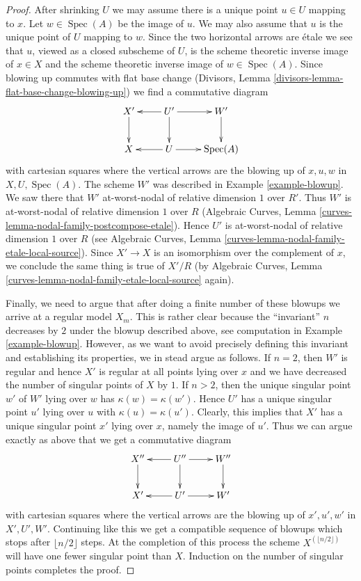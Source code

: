\documentclass[10pt,a4paper]{amsart}
\theoremstyle{plain}
\theoremstyle{definition}
\theoremstyle{remark}
\numberwithin{equation}{subsection}
\def\Spec{\mathop{\mathrm{Spec}}}
\begin{document}
\begin{proof}
\medskip\noindent
After shrinking $U$ we may assume there is
a unique point $u \in U$ mapping to $x$.
Let $w \in \Spec(A)$ be the image of $u$.
We may also assume that $u$ is the unique point of $U$
mapping to $w$.
Since the two horizontal arrows are \'etale
we see that $u$, viewed as a closed subscheme of $U$,
is the scheme theoretic inverse image of $x \in X$ and the
scheme theoretic inverse image of $w \in \Spec(A)$.
Since blowing up commutes with flat base change
(Divisors, Lemma \ref{divisors-lemma-flat-base-change-blowing-up})
we find a commutative diagram
$$
\xymatrix{
X' \ar[d] &
U' \ar[l] \ar[d] \ar[r] &
W' \ar[d] \\
X & U \ar[l] \ar[r] & \Spec(A)
}
$$
with cartesian squares where the vertical arrows are the blowing
up of $x, u, w$ in $X, U, \Spec(A)$. The scheme $W'$ was described
in Example \ref{example-blowup}. We saw there that $W'$
at-worst-nodal of relative dimension $1$ over $R'$. Thus
$W'$ is at-worst-nodal of relative dimension $1$ over $R$
(Algebraic Curves, Lemma \ref{curves-lemma-nodal-family-postcompose-etale}).
Hence $U'$ is at-worst-nodal of relative dimension $1$ over $R$ (see
Algebraic Curves, Lemma \ref{curves-lemma-nodal-family-etale-local-source}).
Since $X' \to X$ is an isomorphism over the complement of $x$,
we conclude the same thing is true of $X'/R$ (by
Algebraic Curves, Lemma \ref{curves-lemma-nodal-family-etale-local-source}
again).

\medskip\noindent
Finally, we need to argue that after doing a finite number
of these blowups we arrive at a regular model $X_m$.
This is rather clear because the ``invariant'' $n$ decreases by $2$
under the blowup described above, see computation in
Example \ref{example-blowup}.
However, as we want to avoid precisely defining this invariant
and establishing its properties, we in stead argue as follows.
If $n = 2$, then $W'$ is regular and hence $X'$
is regular at all points lying over $x$ and we have
decreased the number of singular points of $X$ by $1$.
If $n > 2$, then the unique singular point $w'$ of $W'$ lying over $w$
has $\kappa(w) = \kappa(w')$. Hence $U'$ has a unique
singular point $u'$ lying over $u$ with $\kappa(u) = \kappa(u')$.
Clearly, this implies that $X'$ has a unique singular point $x'$
lying over $x$, namely the image of $u'$. Thus we can
argue exactly as above that we get a commutative diagram
$$
\xymatrix{
X'' \ar[d] &
U'' \ar[l] \ar[d] \ar[r] &
W'' \ar[d] \\
X' & U' \ar[l] \ar[r] & W'
}
$$
with cartesian squares where the vertical arrows are the blowing
up of $x', u', w'$ in $X', U', W'$. Continuing like this we get
a compatible sequence of blowups which stops after
$\lfloor n/2 \rfloor$ steps. At the completion of this process
the scheme $X^{(\lfloor n/2 \rfloor)}$ will have one fewer
singular point than $X$. Induction on the number of singular
points completes the proof.
\end{proof}
\end{document}

